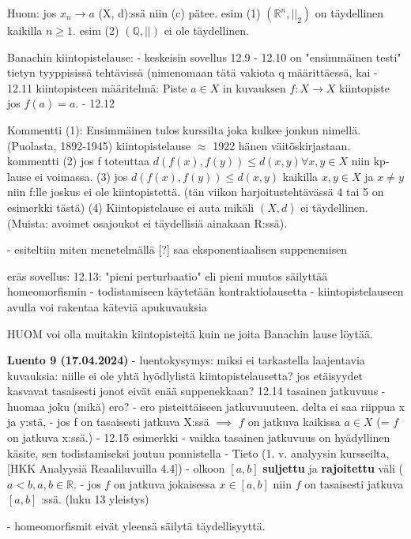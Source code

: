 \documentclass[12pt,a4paper,leqno]{amsart}
\begin{document}
Huom: jos $x_n \rightarrow a$ (X, d):ssä niin (c) pätee.
esim (1) $(\mathbb{R}^n, ||_2)$ on täydellinen kaikilla $n \geq 1$.
esim (2) $(\mathbb{Q}, ||)$ ei ole täydellinen.

Banachin kiintopistelause: 
- keskeisin sovellus 12.9
- 12.10 on "ensimmäinen testi" tietyn tyyppisissä tehtävissä (nimenomaan tätä vakiota q määrittäessä, kai
- 12.11 kiintopisteen määritelmä: Piste $a \in X$ in kuvauksen $f: X \rightarrow X$ kiintopiste jos $f(a) = a$.
- 12.12 

Kommentti (1): Ensimmäinen tulos kurssilta joka kulkee jonkun nimellä. (Puolasta, 1892-1945) kiintopistelause $\approx$ 1922 hänen väitöskirjastaan.
kommentti (2) jos f toteuttaa $d(f(x), f(y)) \leq d(x, y) \forall x, y \in X$ niin kp-lause ei voimassa. 
(3) jos $d(f(x), f(y)) \le d(x, y)$ kaikilla $x, y \in X$ ja $x \neq y$ niin f:lle joskus ei ole kiintopistettä.
(tän viikon harjoitustehtävässä 4 tai 5 on esimerkki tästä)
(4) Kiintopistelause ei auta mikäli $(X, d)$ ei täydellinen. (Muista: avoimet osajoukot ei täydellisiä ainakaan R:ssä). 

- esiteltiin miten menetelmällä [?] saa eksponentiaalisen suppenemisen

eräs sovellus: 12.13: "pieni perturbaatio" eli pieni muutos säilyttää homeomorfismin
  - todistamiseen käytetään kontraktiolausetta
  - kiintopistelauseen avulla voi rakentaa käteviä apukuvauksia

HUOM voi olla muitakin kiintopisteitä kuin ne joita Banachin lause löytää.


\textbf{Luento 9 (17.04.2024)}
- luentokysymys: miksi ei tarkastella laajentavia kuvauksia: niille ei ole yhtä hyödlylistä kiintopistelausetta? jos etäisyydet kasvavat tasaisesti jonot eivät enää suppenekkaan?
12.14 tasainen jatkuvuus
- huomaa joku (mikä) ero? 
  - ero pisteittäiseen jatkuvuuuteen. delta ei saa riippua x ja y:stä, 
- jos f on tasaisesti jatkuva X:ssä $\implies$ $f$ on jatkuva kaikissa $a \in X$ (= $f$ on jatkuva x:ssä.)
- 12.15 esimerkki
- vaikka tasainen jatkuvuus on hyädyllinen käsite, sen todistamiseksi joutuu ponnistella
- Tieto (1. v. analyysin kursseilta, [HKK Analyysiä Reaaliluvuilla 4.4])
  - olkoon $[a, b]$ \textbf{suljettu} ja \textbf{rajoitettu} väli ($a < b, a, b \in \mathbb{R}$.
  - jos $f$ on jatkuva jokaisessa $x \in [a, b]$ niin $f$ on tasaisesti jatkuva $[a, b]$
:ssä. (luku 13 yleistys)

- homeomorfismit eivät yleensä säilytä täydellisyyttä. 
\end{document}

